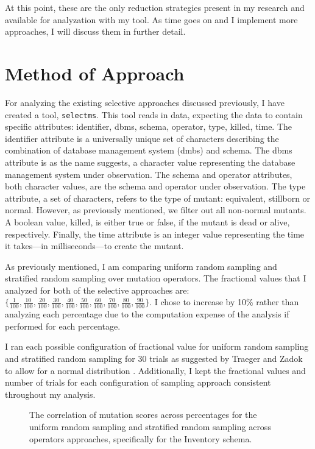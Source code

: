 \documentclass[conference]{IEEEtran}
\begin{document}
At this point, these are the only reduction strategies present in my research and available for analyzation
with my tool. As time goes on and I implement more approaches, I will discuss them in further detail.

\section{Method of Approach}
For analyzing the existing selective approaches discussed previously, I have created
a tool, \texttt{selectms}. This tool reads in data, expecting the data to contain
specific attributes: identifier, dbms, schema, operator, type, killed, time. The identifier attribute
is a universally unique set of characters describing the combination of database management system (dmbs)
and schema. The dbms attribute is as the name suggests, a character value representing the database management system under observation.
The schema and operator attributes, both character values, are the schema and operator under observation. The type attribute, a set of characters,
refers to the type of mutant: equivalent, stillborn or normal. However, as previously mentioned, we filter out all non-normal mutants.
A boolean value, killed, is either true or false, if the mutant is dead or alive, respectively. Finally, the time attribute is an
integer value representing the time it takes---in milliseconds---to create the mutant.

As previously mentioned, I am comparing uniform random sampling and stratified random sampling over mutation operators.
The fractional values that I analyzed for both of the selective approaches are:
$\{\frac{1}{100}, \frac{10}{100}, \frac{20}{100}, \frac{30}{100}, \frac{40}{100}, \frac{50}{100}, \frac{60}{100}, \frac{70}{100}, \frac{80}{100}, \frac{90}{100}\}$.
I chose to increase by 10\% rather than analyzing each percentage due to the computation expense of the analysis if performed for each percentage.

I ran each possible configuration of fractional value for uniform random sampling and stratified random sampling
for 30 trials as suggested by Traeger and Zadok to allow for a normal distribution \cite{traeger2008nine}. Additionally,
I kept the fractional values and number of trials for each configuration of sampling approach consistent throughout
my analysis.

\begin{figure*}[!hb]
\centering
{}
\hfil
{}
\caption{The correlation of mutation scores across percentages for the uniform random sampling and stratified random sampling
across operators approaches, specifically for the Inventory schema.}
\label{fig:comp_corr}
\end{figure*}
\end{document}
